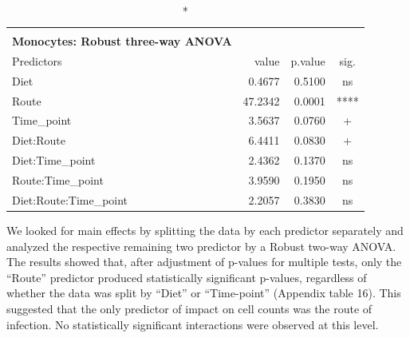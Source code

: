 \documentclass[
  12pt,
  letterpaper,
]{article}
\begin{document}
\begingroup
\fontsize{12.0pt}{14.4pt}\selectfont
\begin{longtable}{l|rrc}
\caption*{
{\large \textbf{Appendix Table 15}} \\ 
{\small \textbf{Monocytes: Robust three-way ANOVA}}
} \\ 
\toprule
Predictors & {value} & {p.value} & {sig.} \\ 
\midrule\addlinespace[2.5pt]
Diet & 0.4677 & 0.5100 & ns \\ 
Route & 47.2342 & 0.0001 & **** \\ 
Time\_point & 3.5637 & 0.0760 & + \\ 
Diet:Route & 6.4411 & 0.0830 & + \\ 
Diet:Time\_point & 2.4362 & 0.1370 & ns \\ 
Route:Time\_point & 3.9590 & 0.1950 & ns \\ 
Diet:Route:Time\_point & 2.2057 & 0.3830 & ns \\ 
\bottomrule
\end{longtable}
\endgroup

We looked for main effects by splitting the data by each predictor separately and analyzed the respective remaining two predictor by a Robust two-way ANOVA. The results showed that, after adjustment of p-values for multiple tests, only the ``Route'' predictor produced statistically significant p-values, regardless of whether the data was split by ``Diet'' or ``Time-point'' (Appendix table 16). This suggested that the only predictor of impact on cell counts was the route of infection. No statistically significant interactions were observed at this level.
\end{document}
